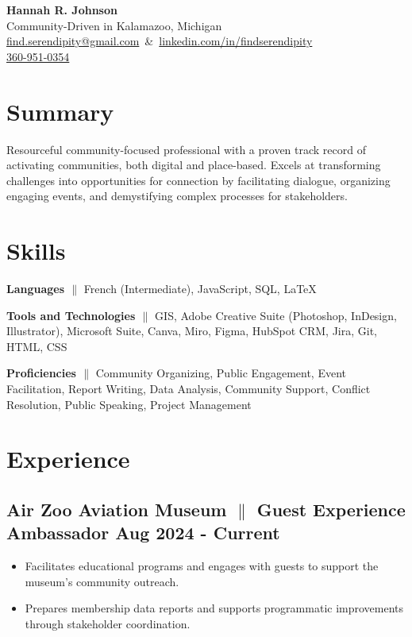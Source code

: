 \documentclass[a4paper,11pt]{article} %
\begin{document}
      \begin{center} %
      {\LARGE \textbf{Hannah R. Johnson}} \\
      Community-Driven in Kalamazoo, Michigan \\
      \mbox{\href{mailto:find.serendipity@gmail.com}{find.serendipity@gmail.com} \&
            \href{https://www.linkedin.com/in/findserendipity/}{linkedin.com/in/findserendipity}}\\
      \href{tel:360-951-0354}{360-951-0354}

\end{center}

\section{Summary }
\noindent
Resourceful community-focused professional with a proven track record of activating communities, both digital and place-based. Excels at transforming challenges into opportunities for connection by facilitating dialogue, organizing engaging events, and demystifying complex processes for stakeholders.

\section{Skills}
\textbf{Languages {$\parallel$}} \small{{ French (Intermediate), JavaScript, SQL, LaTeX }} %

\textbf{Tools and Technologies {$\parallel$}} \small{{ GIS, Adobe Creative Suite (Photoshop, InDesign, Illustrator), Microsoft Suite, Canva, Miro, Figma, HubSpot CRM, Jira, Git, HTML, CSS }} %

\textbf{Proficiencies {$\parallel$}} \small{{ Community Organizing, Public Engagement, Event Facilitation, Report Writing, Data Analysis, Community Support, Conflict Resolution, Public Speaking, Project Management }} %
\section{Experience}
\subsection{\small{ Air Zoo Aviation Museum {$\parallel$} {Guest Experience Ambassador} \hfill \textbf{Aug 2024 - Current}}}
\begin{itemize}
      \item Facilitates educational programs and engages with guests to support the museum’s community outreach.
      \item Prepares membership data reports and supports programmatic improvements through stakeholder coordination.
\end{itemize}
\end{document}
